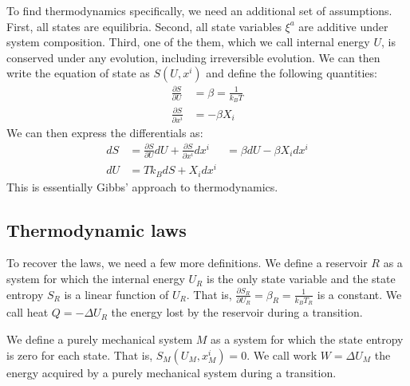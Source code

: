 \documentclass[11pt,letterpaper,fleqn]{memoir} %
\begin{document}
To find thermodynamics specifically, we need an additional set of assumptions. First, all states are equilibria. Second, all state variables $\xi^a$ are additive under system composition. Third, one of the them, which we call internal energy $U$, is conserved under any evolution, including irreversible evolution. We can then write the equation of state as $S(U, x^i)$ and define the following quantities:
\begin{equation}
	\begin{aligned}
		\frac{\partial S}{\partial U} &= \beta = \frac{1}{k_B T} \\
		\frac{\partial S}{\partial x^i} &= - \beta X_i
	\end{aligned}
\end{equation}
We can then express the differentials as:
\begin{equation}
	\begin{aligned}
		dS &= \frac{\partial S}{\partial U} dU + \frac{\partial S}{\partial x^i} dx^i &= \beta dU - \beta X_i dx^i \\
		dU & = T k_B dS + X_i dx^i
	\end{aligned}
\end{equation}
This is essentially Gibbs' approach to thermodynamics.

\subsection{Thermodynamic laws}

To recover the laws, we need a few more definitions. We define a reservoir $R$ as a system for which the internal energy $U_R$ is the only state variable and the state entropy $S_R$ is a linear function of $U_R$. That is, $\frac{\partial S_R}{\partial U_R} = \beta_R = \frac{1}{k_B T_R}$ is a constant. We call heat $Q=-\Delta U_R$ the energy lost by the reservoir during a transition.

We define a purely mechanical system $M$ as a system for which the state entropy is zero for each state. That is, $S_M(U_M, x^i_M) = 0$. We call work $W = \Delta U_M$ the energy acquired by a purely mechanical system during a transition.
\end{document}
